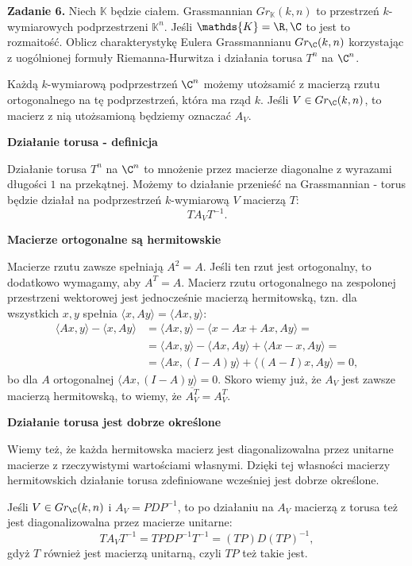 \textbf{\large\color{orange}Zadanie 6.} Niech $\mathds{K}$ będzie ciałem. Grassmannian $Gr_{\mathds{K}}(k,n)$ to przestrzeń $k$-wymiarowych podprzestrzeni $\mathds{K}^n$. Jeśli $\mathds{K}=\R,\C$ to jest to rozmaitość. Oblicz charakterystykę Eulera Grassmannianu $Gr_{\C}(k,n)$ korzystając z uogólnionej formuły Riemanna-Hurwitza i działania torusa $T^n$ na $\C^n$.

\dotfill 

Każdą $k$-wymiarową podprzestrzeń $\C^n$ możemy utożsamić z macierzą rzutu ortogonalnego na tę podprzestrzeń, która ma rząd $k$. Jeśli $V\in Gr_{\C}(k,n)$, to macierz z nią utożsamioną będziemy oznaczać $A_V$.

\textbf{\color{green}Działanie torusa - definicja}

Działanie torusa $T^n$ na $\C^n$ to mnożenie przez macierze diagonalne z wyrazami długości $1$ na przekątnej. Możemy to działanie przenieść na Grassmannian - torus będzie działał na podprzestrzeń $k$-wymiarową $V$ macierzą $T$:
$$TA_VT^{-1}.$$

\textbf{\color{green}Macierze ortogonalne są hermitowskie}

Macierze rzutu zawsze spełniają $A^2=A$. Jeśli ten rzut jest ortogonalny, to dodatkowo wymagamy, aby $A^T=A$. Macierz rzutu ortogonalnego na zespolonej przestrzeni wektorowej jest jednocześnie macierzą hermitowską, tzn. dla wszystkich $x,y$ spełnia $\langle x, Ay\rangle = \langle Ax, y\rangle$:
\begin{align*}
  \langle Ax, y\rangle -\langle x, Ay\rangle &= \langle Ax, y\rangle -\langle x-Ax+Ax, Ay\rangle=\\ 
  &=\langle Ax, y\rangle -\langle Ax, Ay\rangle + \langle Ax-x, Ay\rangle=\\ 
  &=\langle Ax, (I-A)y\rangle + \langle (A-I)x, Ay\rangle=0,
\end{align*}
bo dla $A$ ortogonalnej $\langle Ax, (I-A)y\rangle =0$. Skoro wiemy już, że $A_V$ jest zawsze macierzą hermitowską, to wiemy, że $\overline{A_V^T}=A_V^T$.

\textbf{\color{green}Działanie torusa jest dobrze określone}

Wiemy też, że każda hermitowska macierz jest diagonalizowalna przez unitarne macierze z rzeczywistymi wartościami własnymi. Dzięki tej własności macierzy hermitowskich działanie torusa zdefiniowane wcześniej jest dobrze określone.

Jeśli $V\in Gr_{\C}(k,n)$ i $A_V=PDP^{-1}$, to po działaniu na $A_V$ macierzą z torusa też jest diagonalizowalna przez macierze unitarne:
$$TA_VT^{-1}=TPDP^{-1}T^{-1}=(TP)D(TP)^{-1},$$
gdyż $T$ również jest macierzą unitarną, czyli $TP$ też takie jest.


